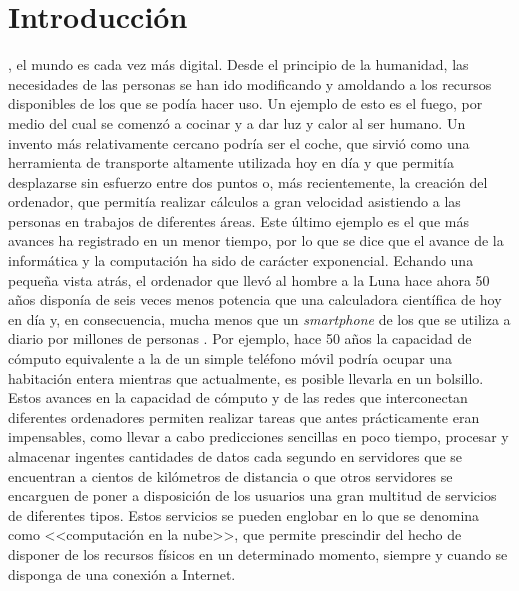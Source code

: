 \chapter{Introducción}
\label{chap:introduccion}

, el mundo es cada vez más digital. Desde el principio de la humanidad, las necesidades de las personas se han ido modificando y amoldando a los recursos disponibles de los que se podía hacer uso. Un ejemplo de esto es el fuego, por medio del cual se comenzó a cocinar y a dar luz y calor al ser humano. Un invento más relativamente cercano podría ser el coche, que sirvió como una herramienta de transporte altamente utilizada hoy en día y que permitía desplazarse sin esfuerzo entre dos puntos o, más recientemente, la creación del ordenador, que permitía realizar cálculos a gran velocidad asistiendo a las personas en trabajos de diferentes áreas. Este último ejemplo es el que más avances ha registrado en un menor tiempo, por lo que se dice que el avance de la informática y la computación ha sido de carácter exponencial. Echando una pequeña vista atrás, el ordenador que llevó al hombre a la Luna hace ahora 50 años disponía de seis veces menos potencia que una calculadora científica de hoy en día y, en consecuencia, mucha menos que un \textit{smartphone} de los que se utiliza a diario por millones de personas \cite{lacaixa2017}. Por ejemplo, hace 50 años la capacidad de cómputo equivalente a la de un simple teléfono móvil podría ocupar una habitación entera mientras que actualmente, es posible llevarla en un bolsillo. Estos avances en la capacidad de cómputo y de las redes que interconectan diferentes ordenadores permiten realizar tareas que antes prácticamente eran impensables, como llevar a cabo predicciones sencillas en poco tiempo, procesar y almacenar ingentes cantidades de datos cada segundo en servidores que se encuentran a cientos de kilómetros de distancia o que otros servidores se encarguen de poner a disposición de los usuarios una gran multitud de servicios de diferentes tipos. Estos servicios se pueden englobar en lo que se denomina como <<computación en la nube>>, que permite prescindir del hecho de disponer de los recursos físicos en un determinado momento, siempre y cuando se disponga de una conexión a Internet.

